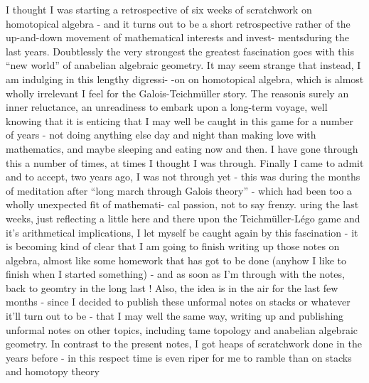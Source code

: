 
I thought I was starting a retrospective of six weeks of scratchwork
on homotopical algebra  -  and it turns out to be a  short retrospective
rather of the up-and-down movement of  mathematical interests and invest-%
ments\hand{|}during the last years.  Doubtlessly the very strongest\unsure{\hand{,}}  the greatest
fascination goes with this ``new world'' of anabelian algebraic geometry.
It may seem strange that instead,  I am indulging in this lengthy digressi-%
-on on homotopical algebra,  which is almost wholly irrelevant I feel for
the Galois-Teichmüller story.  The reason\hand{|}is surely an inner reluctance,
an unreadiness to embark upon a long-term voyage,  well knowing that it is
 enticing that I may well be caught in this game for a number of
years - not doing anything else  day and night than making love with
mathematics,  and maybe sleeping and eating now and then.  I have gone
through this a number of times,  at times I thought I was through.  Finally
I came to admit and to accept,  two years ago,  I was not through yet -
this was during the months of meditation after  ``long march through
Galois theory'' -  which had been\hand{,} too\hand{,} a wholly unexpected fit of mathemati-%
cal passion, not to say frenzy.   uring the last weeks,  just
reflecting a little here and there upon the Teichmüller-Légo game and
it's arithmetical implications,  I let myself be caught again by this
fascination  - it is becoming kind of clear  that I am going to finish
writing up those notes on algebra,  almost like some homework that has got
to be done (anyhow I like to finish when I started  something)  -  and
as soon as I'm through with the notes,  back to geomtry in the long last !
Also,  the idea is in the air for the last few months  -  since I decided
to publish these unformal notes on stacks or whatever it'll turn out to be -
that I may well  the same way,  writing up and publishing unformal notes
on other topics,  including tame topology and anabelian algebraic geometry.
In contrast to the present notes,  I got heaps of scratchwork done  in the
years before  -  in this respect time is even riper for me to ramble  
 than on stacks and homotopy theory

